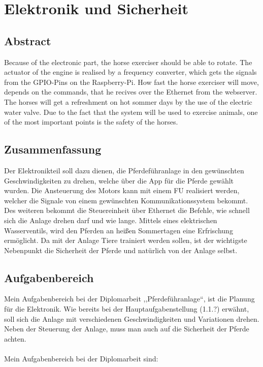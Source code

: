 \chapter{Elektronik und Sicherheit}
\label{sec:elektronikUndSicherheit}

\section{Abstract}
\label{sec:abstractETE}

Because of the electronic part, the horse exerciser should be able to rotate. \cite{test-buch}
The actuator of the engine is realised by a frequency converter, which gets the signals from the GPIO-Pins on the Raspberry-Pi.
How fast the horse exerciser will move, depends on the commands, that he recives over the Ethernet from the webserver.
The horses will get a refreshment on hot sommer days by the use of the electric water valve.
Due to the fact that the system will be used to exercise animals, one of the most important points is the safety of the horses.

\section{Zusammenfassung}
\label{sec:zusammenfassung}

Der Elektronikteil soll dazu dienen, die Pferdeführanlage in den gewünschten Geschwindigkeiten zu drehen, welche über die App für die Pferde gewählt wurden. 
Die Ansteuerung des Motors kann mit einem \ac{FU} realisiert werden, 
welcher die Signale von einem gewünschten Kommunikationssystem bekommt.
Des weiteren bekommt die Steuereinheit über Ethernet die Befehle, wie schnell sich die Anlage drehen darf und wie lange. 
Mittels eines elektrischen Wasserventils, wird den Pferden an heißen Sommertagen eine Erfrischung ermöglicht. 
Da mit der Anlage Tiere trainiert werden sollen, ist der wichtigste Nebenpunkt die Sicherheit der Pferde und natürlich von der Anlage selbst.
\newpage

\section{Aufgabenbereich}
\label{sec:aufgabenbereich}

Mein Aufgabenbereich bei der Diplomarbeit ,,Pferdeführanlage“, ist die Planung für die Elektronik. Wie bereits bei der Hauptaufgabenstellung (1.1.?) erwähnt, 
soll sich die Anlage mit verschiedenen Geschwindigkeiten und Variationen drehen.  Neben der Steuerung der Anlage, muss man auch auf die Sicherheit der Pferde achten.
\\
\\
Mein Aufgabenbereich bei der Diplomarbeit sind:

